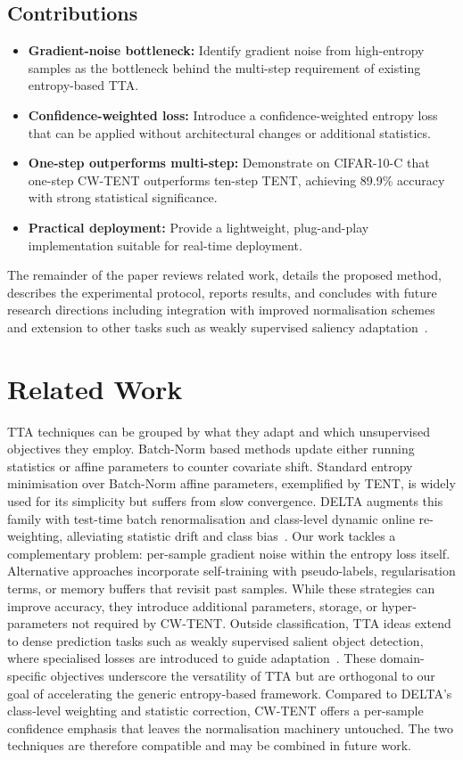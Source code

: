 \documentclass{article} %
\begin{document}
\subsection{Contributions}
\begin{itemize}
  \item \textbf{Gradient-noise bottleneck:} Identify gradient noise from high-entropy samples as the bottleneck behind the multi-step requirement of existing entropy-based TTA\@.
  \item \textbf{Confidence-weighted loss:} Introduce a confidence-weighted entropy loss that can be applied without architectural changes or additional statistics.
  \item \textbf{One-step outperforms multi-step:} Demonstrate on CIFAR-10-C that one-step CW-TENT outperforms ten-step TENT, achieving 89.9\% accuracy with strong statistical significance.
  \item \textbf{Practical deployment:} Provide a lightweight, plug-and-play implementation suitable for real-time deployment.
\end{itemize}
The remainder of the paper reviews related work, details the proposed method, describes the experimental protocol, reports results, and concludes with future research directions including integration with improved normalisation schemes~\cite{zhao-2023-delta} and extension to other tasks such as weakly supervised saliency adaptation~\cite{author-year-test}.

\section{Related Work}\label{sec:related}%
TTA techniques can be grouped by what they adapt and which unsupervised objectives they employ. Batch-Norm based methods update either running statistics or affine parameters to counter covariate shift. Standard entropy minimisation over Batch-Norm affine parameters, exemplified by TENT, is widely used for its simplicity but suffers from slow convergence. DELTA augments this family with test-time batch renormalisation and class-level dynamic online re-weighting, alleviating statistic drift and class bias~\cite{zhao-2023-delta}. Our work tackles a complementary problem: per-sample gradient noise within the entropy loss itself.
Alternative approaches incorporate self-training with pseudo-labels, regularisation terms, or memory buffers that revisit past samples. While these strategies can improve accuracy, they introduce additional parameters, storage, or hyper-parameters not required by CW-TENT\@.
Outside classification, TTA ideas extend to dense prediction tasks such as weakly supervised salient object detection, where specialised losses are introduced to guide adaptation~\cite{author-year-test}. These domain-specific objectives underscore the versatility of TTA but are orthogonal to our goal of accelerating the generic entropy-based framework.
Compared to DELTA's class-level weighting and statistic correction, CW-TENT offers a per-sample confidence emphasis that leaves the normalisation machinery untouched. The two techniques are therefore compatible and may be combined in future work.
\end{document}
